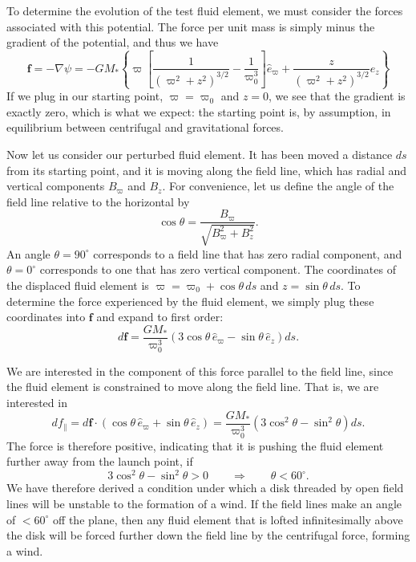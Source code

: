 To determine the evolution of the test fluid element, we must consider the forces associated with this potential. The force per unit mass  is simply minus the gradient of the potential, and thus we have
\begin{equation}
\mathbf{f} = -\nabla \psi = -GM_* \left\{ \varpi \left[\frac{1}{(\varpi^2+z^2)^{3/2}} - \frac{1}{\varpi_0^3}\right]\hat{e}_\varpi + \frac{z}{(\varpi^2+z^2)^{3/2}} \hat{e}_z \right\}
\end{equation}
If we plug in our starting point, $\varpi = \varpi_0$ and $z=0$, we see that the gradient is exactly zero, which is what we expect: the starting point is, by assumption, in equilibrium between centrifugal and gravitational forces.

Now let us consider our perturbed fluid element. It has been moved a distance $ds$ from its starting point, and it is moving along the field line, which has radial and vertical components $B_\varpi$ and $B_z$. For convenience, let us define the angle of the field line relative to the horizontal by
\begin{equation}
\cos \theta = \frac{B_\varpi}{\sqrt{B_\varpi^2 + B_z^2}}.
\end{equation}
An angle $\theta=90^\circ$ corresponds to a field line that has zero radial component, and $\theta=0^\circ$ corresponds to one that has zero vertical component. The coordinates of the displaced fluid element is $\varpi = \varpi_0 + \cos\theta \, ds$ and $z = \sin\theta \, ds$. To determine the force experienced by the fluid element, we simply plug these coordinates into $\mathbf{f}$ and expand to first order:
\begin{equation}
d\mathbf{f} = \frac{GM_*}{\varpi_0^3} \left(3 \cos\theta\,\hat{e}_\varpi - \sin\theta\,\hat{e}_z\right) ds.
\end{equation}

We are interested in the component of this force parallel to the field line, since the fluid element is constrained to move along the field line. That is, we are interested in
\begin{equation}
df_\parallel = d\mathbf{f} \cdot (\cos\theta\,\hat{e}_\varpi +  \sin \theta\,\hat{e}_z) = \frac{GM_*}{\varpi_0^3} \left(3\cos^2 \theta - \sin^2 \theta\right) ds.
\end{equation}
The force is therefore positive, indicating that it is pushing the fluid element further away from the launch point, if
\begin{equation}
3 \cos^2 \theta - \sin^2 \theta > 0
\qquad\Longrightarrow\qquad
\theta < 60^\circ.
\end{equation}
We have therefore derived a condition under which a disk threaded by open field lines will be unstable to the formation of a wind. If the field lines make an angle of $<60^\circ$ off the plane, then any fluid element that is lofted infinitesimally above the disk will be forced further down the field line by the centrifugal force, forming a wind.

